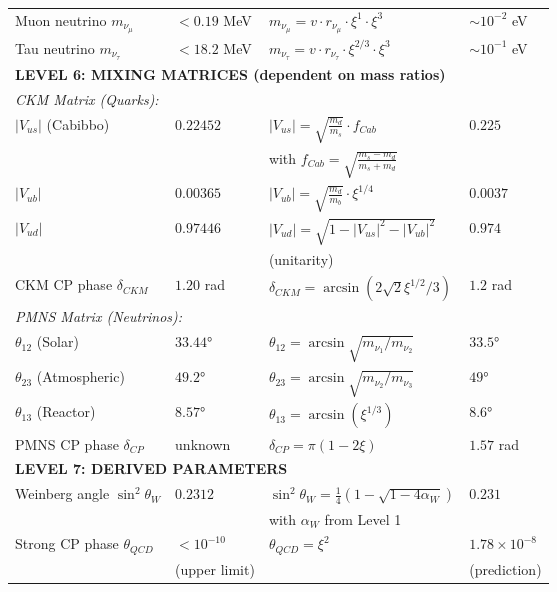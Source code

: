 \documentclass[12pt,a4paper]{article}
\begin{document}
\begin{longtable}{p{5cm}p{4cm}p{3.5cm}p{3.5cm}}
	Muon neutrino $m_{\nu_\mu}$ & $< 0.19$ MeV & $m_{\nu_\mu} = v \cdot r_{\nu_\mu} \cdot \xi^{1} \cdot \xi^3$ & $\sim 10^{-2}$ eV \\
	
	Tau neutrino $m_{\nu_\tau}$ & $< 18.2$ MeV & $m_{\nu_\tau} = v \cdot r_{\nu_\tau} \cdot \xi^{2/3} \cdot \xi^3$ & $\sim 10^{-1}$ eV \\
	
	\midrule
	\multicolumn{4}{l}{\textbf{LEVEL 6: MIXING MATRICES (dependent on mass ratios)}} \\
	\midrule
	
	\multicolumn{4}{l}{\textit{CKM Matrix (Quarks):}} \\
	
	$|V_{us}|$ (Cabibbo) & $0.22452$ & $|V_{us}| = \sqrt{\frac{m_d}{m_s}} \cdot f_{Cab}$ & $0.225$ \\
	& & with $f_{Cab} = \sqrt{\frac{m_s - m_d}{m_s + m_d}}$ & \\[0.3em]
	
	$|V_{ub}|$ & $0.00365$ & $|V_{ub}| = \sqrt{\frac{m_d}{m_b}} \cdot \xi^{1/4}$ & $0.0037$ \\
	
	$|V_{ud}|$ & $0.97446$ & $|V_{ud}| = \sqrt{1 - |V_{us}|^2 - |V_{ub}|^2}$ & $0.974$ \\
	& & (unitarity) & \\[0.3em]
	
	CKM CP phase $\delta_{CKM}$ & $1.20$ rad & $\delta_{CKM} = \arcsin(2\sqrt{2}\xi^{1/2}/3)$ & $1.2$ rad \\
	
	\multicolumn{4}{l}{\textit{PMNS Matrix (Neutrinos):}} \\
	
	$\theta_{12}$ (Solar) & $33.44°$ & $\theta_{12} = \arcsin\sqrt{m_{\nu_1}/m_{\nu_2}}$ & $33.5°$ \\
	
	$\theta_{23}$ (Atmospheric) & $49.2°$ & $\theta_{23} = \arcsin\sqrt{m_{\nu_2}/m_{\nu_3}}$ & $49°$ \\
	
	$\theta_{13}$ (Reactor) & $8.57°$ & $\theta_{13} = \arcsin(\xi^{1/3})$ & $8.6°$ \\
	
	PMNS CP phase $\delta_{CP}$ & unknown & $\delta_{CP} = \pi(1 - 2\xi)$ & $1.57$ rad \\
	
	\midrule
	\multicolumn{4}{l}{\textbf{LEVEL 7: DERIVED PARAMETERS}} \\
	\midrule
	
	Weinberg angle $\sin^2\theta_W$ & $0.2312$ & $\sin^2\theta_W = \frac{1}{4}(1-\sqrt{1-4\alpha_W})$ & $0.231$ \\
	& & with $\alpha_W$ from Level 1 & \\[0.3em]
	
	Strong CP phase $\theta_{QCD}$ & $< 10^{-10}$ & $\theta_{QCD} = \xi^{2}$ & $1.78 \times 10^{-8}$ \\
	& (upper limit) & & (prediction) \\
	
\end{longtable}
\end{document}
